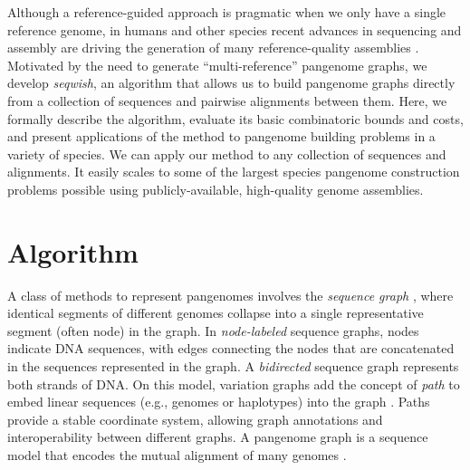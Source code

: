 \documentclass{bioinfo}
\theoremstyle{definition}
\begin{document}
Although a reference-guided approach is pragmatic when we only have a single reference genome, in humans and other species recent advances in sequencing and assembly are driving the generation of many reference-quality assemblies \citep{Nurk_2021}.
Motivated by the need to generate ``multi-reference'' pangenome graphs, we develop \textit{seqwish}, an algorithm that allows us to build pangenome graphs directly from a collection of sequences and pairwise alignments between them.
Here, we formally describe the algorithm, evaluate its basic combinatoric bounds and costs, and present applications of the method to pangenome building problems in a variety of species.
We can apply our method to any collection of sequences and alignments.
It easily scales to some of the largest species pangenome construction problems possible using publicly-available, high-quality genome assemblies.



\section{Algorithm}
\label{sec:algorithm}

A class of methods to represent pangenomes involves the \textit{sequence graph} \citep{Hein_1989}, where identical segments of different genomes collapse into a single representative segment (often node) in the graph.
In \textit{node-labeled} sequence graphs, nodes indicate DNA sequences, with edges connecting the nodes that are concatenated in the sequences represented in the graph.
A \textit{bidirected} sequence graph represents both strands of DNA.
On this model, variation graphs add the concept of \textit{path} to embed linear sequences (e.g., genomes or haplotypes) into the graph \citep{Garrison_2018}.
Paths provide a stable coordinate system, allowing graph annotations and interoperability between different graphs.
A pangenome graph is a sequence model that encodes the mutual alignment of many genomes \citep{Eizenga_2020}.
\end{document}

